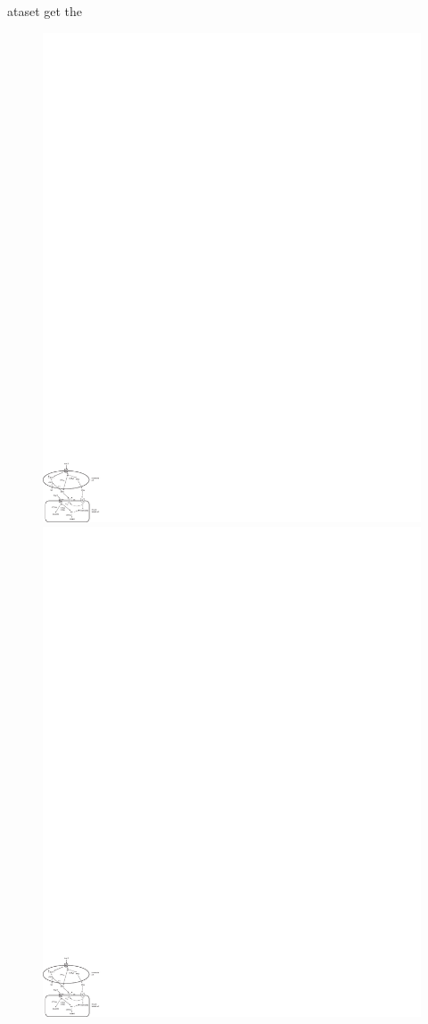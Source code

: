 \documentclass[3p,times,procedia]{elsarticle}
\begin{document}
ataset get the

\begin{figure}[h]
\centerline{\includegraphics{fx1}\hspace*{5mm}\includegraphics{fx1}}

\end{figure}
\end{document}
